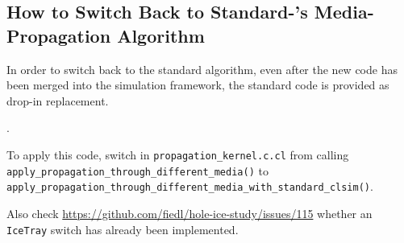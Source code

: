 \subsection{How to Switch Back to Standard-\clsim's Media-Propagation Algorithm}
\label{sec:how_to_switch_media_propagation}

In order to switch back to the standard \clsim algorithm, even after the
new code has been merged into the \icecube simulation framework, the
standard \clsim code is provided as drop-in replacement.

.

To apply this code, switch in \texttt{propagation\_kernel.c.cl} \newline
from calling \texttt{apply\_propagation\_through\_different\_media()}
\newline
to
\texttt{apply\_propagation\_through\_different\_media\_with\_standard\_clsim()}.

Also check \url{https://github.com/fiedl/hole-ice-study/issues/115}
whether an \texttt{IceTray} switch has already been implemented.
